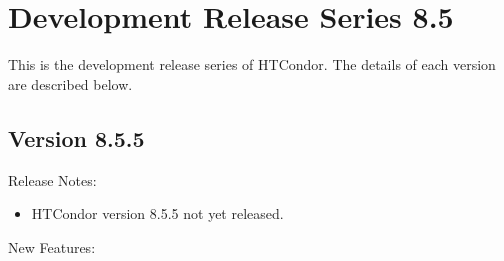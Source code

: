 
\section{\label{sec:History-8-5}Development Release Series 8.5}

This is the development release series of HTCondor.
The details of each version are described below.

\subsection*{\label{sec:New-8-5-5}Version 8.5.5}

\noindent Release Notes:

\begin{itemize}

\item HTCondor version 8.5.5 not yet released.

\end{itemize}


\noindent New Features:

